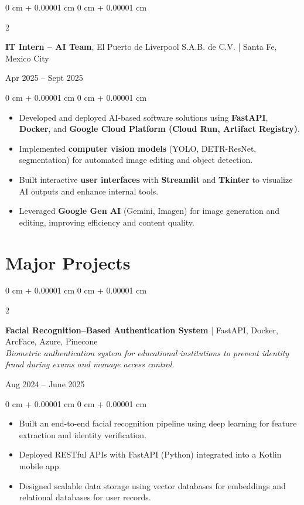 \documentclass[10pt, letterpaper]{article}
\newenvironment{highlights}{
	\begin{itemize}[
		topsep=0.10 cm,
		parsep=0.10 cm,
		partopsep=0pt,
		itemsep=0pt,
		leftmargin=0 cm + 10pt
		]
	}{
	\end{itemize}
} %
\newenvironment{onecolentry}{
	\begin{adjustwidth}{
			0 cm + 0.00001 cm
		}{
			0 cm + 0.00001 cm
		}
	}{
	\end{adjustwidth}
} %
\newenvironment{twocolentry}[2][]{
	\onecolentry
	\def\secondColumn{#2}
	\setcolumnwidth{\fill, 4.5 cm}
	\begin{paracol}{2}
	}{
		\switchcolumn \raggedleft \secondColumn
	\end{paracol}
	\endonecolentry
} %
\begin{document}
\begin{twocolentry}{
		Apr 2025 – Sept 2025
	}
	\textbf{IT Intern – AI Team}, El Puerto de Liverpool S.A.B. de C.V. | Santa Fe, Mexico City
\end{twocolentry}

\vspace{0.10 cm}
\begin{onecolentry}
	\begin{highlights}
		\item Developed and deployed AI-based software solutions using \textbf{FastAPI}, \textbf{Docker}, and \textbf{Google Cloud Platform (Cloud Run, Artifact Registry)}.
		\item Implemented \textbf{computer vision models} (YOLO, DETR-ResNet, segmentation) for automated image editing and object detection.
		\item Built interactive \textbf{user interfaces} with \textbf{Streamlit} and \textbf{Tkinter} to visualize AI outputs and enhance internal tools.
		\item Leveraged \textbf{Google Gen AI} (Gemini, Imagen) for image generation and editing, improving efficiency and content quality.
	\end{highlights}
\end{onecolentry}

	
	
	
	
\section{Major Projects}

\begin{twocolentry}{
		Aug 2024 – June 2025
	}
	\textbf{Facial Recognition–Based Authentication System} | FastAPI, Docker, ArcFace, Azure, Pinecone\\
	\textit{Biometric authentication system for educational institutions to prevent identity fraud during exams and manage access control.}
\end{twocolentry}

\vspace{0.10 cm}
\begin{onecolentry}
	\begin{highlights}
		\item Built an end-to-end facial recognition pipeline using deep learning for feature extraction and identity verification.
		\item Deployed RESTful APIs with FastAPI (Python) integrated into a Kotlin mobile app.
		\item Designed scalable data storage using vector databases for embeddings and relational databases for user records.
	\end{highlights}
\end{onecolentry}
\end{document}
